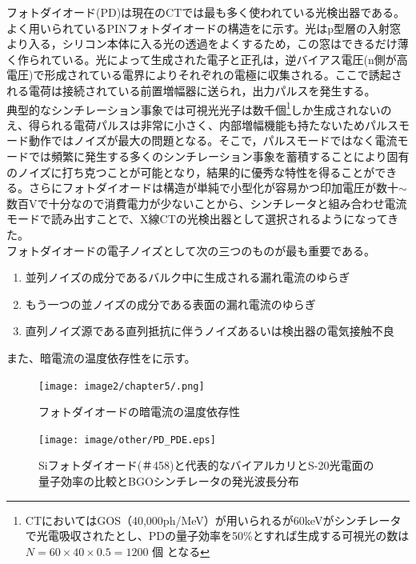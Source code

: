 フォトダイオード(PD)は現在のCTでは最も多く使われている光検出器である。よく用いられているPINフォトダイオードの構造をに示す。光はp型層の入射窓より入る，シリコン本体に入る光の透過をよくするため，この窓はできるだけ薄く作られている。光によって生成された電子と正孔は，逆バイアス電圧(n側が高電圧)で形成されている電界によりそれぞれの電極に収集される。ここで誘起される電荷は接続されている前置増幅器に送られ，出力パルスを発生する。\\
典型的なシンチレーション事象では可視光光子は数千個\footnote{CTにおいてはGOS（40,000ph/MeV）が用いられるが60keVがシンチレータで光電吸収されたとし、PDの量子効率を50\%とすれば生成する可視光の数は$N =60\times 40\times 0.5=1200$ 個
となる}しか生成されないのえ、得られる電荷パルスは非常に小さく、内部増幅機能も持たないためパルスモード動作ではノイズが最大の問題となる。そこで，パルスモードではなく電流モードでは頻繁に発生する多くのシンチレーション事象を蓄積することにより固有のノイズに打ち克つことが可能となり，結果的に優秀な特性を得ることができる。さらにフォトダイオードは構造が単純で小型化が容易かつ印加電圧が数十$\sim$数百Vで十分なので消費電力が少ないことから、シンチレータと組み合わせ電流モードで読み出すことで、X線CTの光検出器として選択されるようになってきた。\\
フォトダイオードの電子ノイズとして次の三つのものが最も重要である。
\begin{enumerate}
\item 並列ノイズの成分であるバルク中に生成される漏れ電流のゆらぎ
\item もう一つの並ノイズの成分である表面の漏れ電流のゆらぎ
\item 直列ノイズ源である直列抵抗に伴うノイズあるいは検出器の電気接触不良
\end{enumerate}
また、暗電流の温度依存性をに示す。



\begin{figure}[H]
 \begin{center}
 \texttt{[image: image2/chapter5/.png]} 
 \end{center}
 \caption{フォトダイオードの暗電流の温度依存性}
 \label{fig:PD_darkcurrents}
\end{figure}
\fi


\begin{figure}[H]
 \begin{center}
 \texttt{[image: image/other/PD\_PDE.eps]}
 \end{center}
 \caption{Siフォトダイオード(＃458)と代表的なバイアルカリとS-20光電面の量子効率の比較とBGOシンチレータの発光波長分布\cite{radiation_handbook}}
 \label{fig:ryousi_PD}
\end{figure}


